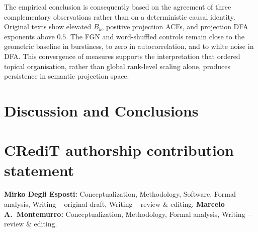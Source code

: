 \documentclass[preprint]{elsarticle}
\newcommand{\TODO}[1]{\textcolor{red}{\textbf{[TODO: #1]}}}
\newcommand{\NOTE}[1]{\textcolor{blue}{\textbf{[NOTE: #1]}}}
\begin{document}
The empirical conclusion is consequently based on the agreement of
three complementary observations rather than on a deterministic causal
identity. Original texts show elevated $B_k$, positive projection ACFs,
and projection DFA exponents above $0.5$. The FGN and word-shuffled controls remain 
close to the geometric
baseline in burstiness, to zero in autocorrelation, and to white noise
in DFA. This convergence of measures supports the
interpretation that ordered topical organisation, rather than global
rank-level scaling alone, produces persistence in semantic projection
space.

\FloatBarrier
\section{Discussion and Conclusions}
\label{sec:discussion}

%
%


\section*{CRediT authorship contribution statement}
\textbf{Mirko Degli Esposti:} Conceptualization, Methodology, Software,
Formal analysis, Writing -- original draft, Writing -- review \& editing.
\textbf{Marcelo A.\ Montemurro:} Conceptualization, Methodology,
Formal analysis, Writing -- review \& editing.
 
\end{document}
